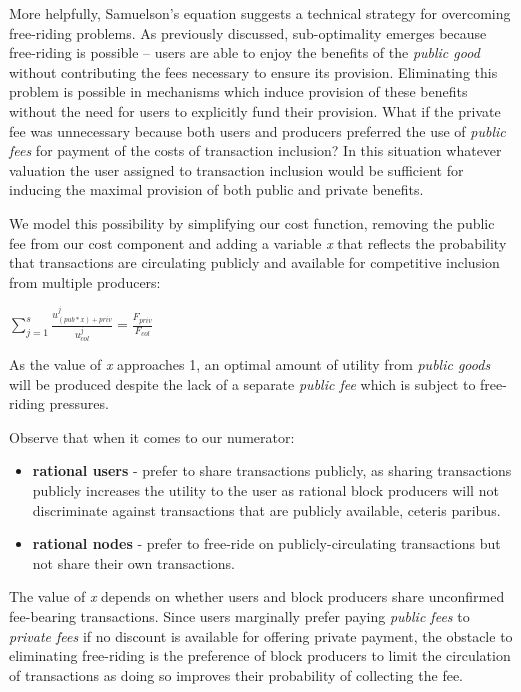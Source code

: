 \documentclass[oneside]{article}   	%
\begin{document}
More helpfully, Samuelson's equation suggests a technical strategy for overcoming free-riding problems. As previously discussed, sub-optimality emerges because free-riding is possible -- users are able to enjoy the benefits of the \textit{public good} without contributing the fees necessary to ensure its provision. Eliminating this problem is possible in mechanisms which induce provision of these benefits without the need for users to explicitly fund their provision. What if the private fee was unnecessary because both users and producers preferred the use of \textit{public fees} for payment of the costs of transaction inclusion? In this situation whatever valuation the user assigned to transaction inclusion would be sufficient for inducing the maximal provision of both public and private benefits.

We model this possibility by simplifying our cost function, removing the public fee from our cost component and adding a variable \textit{x} that reflects the probability that transactions are circulating publicly and available for competitive inclusion from multiple producers:

\LARGE
\begin{adjustwidth}{1.5em}{1.5em}
\begin{math}
\sum_{j=1}^{s} \frac{u_{({pub}*{x})+{priv}}^j}{u_{col}^j} = \frac{F_{{priv}}}{F_{col}}
\end{math}
\end{adjustwidth}
\normalsize

As the value of \textit{x} approaches 1, an optimal amount of utility from \textit{public goods} will be produced despite the lack of a separate \textit{public fee} which is subject to free-riding pressures.

Observe that when it comes to our numerator:

\begin{itemize}
  \item \textbf{rational users} - prefer to share transactions publicly, as sharing transactions publicly increases the utility to the user as rational block producers will not discriminate against transactions that are publicly available, ceteris paribus.
  \item \textbf{rational nodes} - prefer to free-ride on publicly-circulating transactions but not share their own transactions.
\end{itemize}

The value of \textit{x} depends on whether users and block producers share unconfirmed fee-bearing transactions. Since users marginally prefer paying \textit{public fees} to \textit{private fees} if no discount is available for offering private payment, the obstacle to eliminating free-riding is the preference of block producers to limit the circulation of transactions as doing so improves their probability of collecting the fee.
\end{document}
